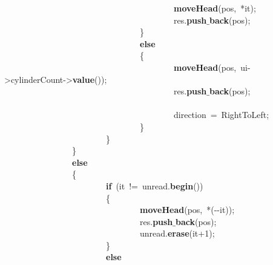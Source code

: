\mbox{}\ \ \ \ \ \ \ \ \ \ \ \ \ \ \ \ \ \ \ \ \ \ \ \ \ \ \ \ \ \ \ \ \ \ \ \ \ \ \ \ \textbf{moveHead}(pos,\ *it); \\
\mbox{}\ \ \ \ \ \ \ \ \ \ \ \ \ \ \ \ \ \ \ \ \ \ \ \ \ \ \ \ \ \ \ \ \ \ \ \ \ \ \ \ res.\textbf{push$\_$back}(pos); \\
\mbox{}\ \ \ \ \ \ \ \ \ \ \ \ \ \ \ \ \ \ \ \ \ \ \ \ \ \ \ \ \ \ \ \ \} \\
\mbox{}\ \ \ \ \ \ \ \ \ \ \ \ \ \ \ \ \ \ \ \ \ \ \ \ \ \ \ \ \ \ \ \ \textbf{else} \\
\mbox{}\ \ \ \ \ \ \ \ \ \ \ \ \ \ \ \ \ \ \ \ \ \ \ \ \ \ \ \ \ \ \ \ \{ \\
\mbox{}\ \ \ \ \ \ \ \ \ \ \ \ \ \ \ \ \ \ \ \ \ \ \ \ \ \ \ \ \ \ \ \ \ \ \ \ \ \ \ \ \textbf{moveHead}(pos,\ ui-\textgreater{}cylinderCount-\textgreater{}\textbf{value}()); \\
\mbox{}\ \ \ \ \ \ \ \ \ \ \ \ \ \ \ \ \ \ \ \ \ \ \ \ \ \ \ \ \ \ \ \ \ \ \ \ \ \ \ \ res.\textbf{push$\_$back}(pos); \\
\mbox{} \\
\mbox{}\ \ \ \ \ \ \ \ \ \ \ \ \ \ \ \ \ \ \ \ \ \ \ \ \ \ \ \ \ \ \ \ \ \ \ \ \ \ \ \ direction\ =\ RightToLeft; \\
\mbox{}\ \ \ \ \ \ \ \ \ \ \ \ \ \ \ \ \ \ \ \ \ \ \ \ \ \ \ \ \ \ \ \ \} \\
\mbox{}\ \ \ \ \ \ \ \ \ \ \ \ \ \ \ \ \ \ \ \ \ \ \ \ \} \\
\mbox{}\ \ \ \ \ \ \ \ \ \ \ \ \ \ \ \ \} \\
\mbox{}\ \ \ \ \ \ \ \ \ \ \ \ \ \ \ \ \textbf{else} \\
\mbox{}\ \ \ \ \ \ \ \ \ \ \ \ \ \ \ \ \{ \\
\mbox{}\ \ \ \ \ \ \ \ \ \ \ \ \ \ \ \ \ \ \ \ \ \ \ \ \textbf{if}\ (it\ !=\ unread.\textbf{begin}()) \\
\mbox{}\ \ \ \ \ \ \ \ \ \ \ \ \ \ \ \ \ \ \ \ \ \ \ \ \{ \\
\mbox{}\ \ \ \ \ \ \ \ \ \ \ \ \ \ \ \ \ \ \ \ \ \ \ \ \ \ \ \ \ \ \ \ \textbf{moveHead}(pos,\ *(-\/-it)); \\
\mbox{}\ \ \ \ \ \ \ \ \ \ \ \ \ \ \ \ \ \ \ \ \ \ \ \ \ \ \ \ \ \ \ \ res.\textbf{push$\_$back}(pos); \\
\mbox{}\ \ \ \ \ \ \ \ \ \ \ \ \ \ \ \ \ \ \ \ \ \ \ \ \ \ \ \ \ \ \ \ unread.\textbf{erase}(it+1); \\
\mbox{}\ \ \ \ \ \ \ \ \ \ \ \ \ \ \ \ \ \ \ \ \ \ \ \ \} \\
\mbox{}\ \ \ \ \ \ \ \ \ \ \ \ \ \ \ \ \ \ \ \ \ \ \ \ \textbf{else} \\
